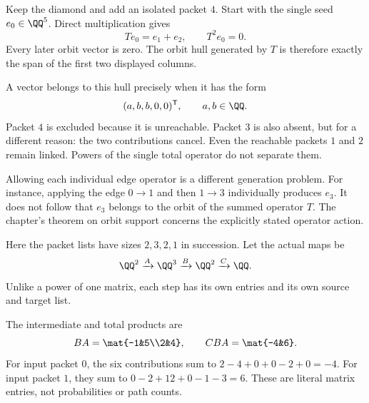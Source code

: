 Keep the diamond and add an isolated packet $4$. Start with the single seed $e_0\in\QQ^5$. Direct multiplication gives
\[
Te_0=e_1+e_2,\qquad T^2e_0=0.
\]
Every later orbit vector is zero. The orbit hull generated by $T$ is therefore exactly the span of the first two displayed columns.


A vector belongs to this hull precisely when it has the form
\[
(a,b,b,0,0)^\mathsf T,\qquad a,b\in\QQ.
\]
Packet $4$ is excluded because it is unreachable. Packet $3$ is also absent, but for a different reason: the two contributions cancel. Even the reachable packets $1$ and $2$ remain linked. Powers of the single total operator do not separate them.

Allowing each individual edge operator is a different generation problem. For instance, applying the edge $0\to1$ and then $1\to3$ individually produces $e_3$. It does not follow that $e_3$ belongs to the orbit of the summed operator $T$. The chapter's theorem on orbit support concerns the explicitly stated operator action.


Here the packet lists have sizes $2,3,2,1$ in succession. Let the actual maps be
\[
\QQ^2\xrightarrow{A}\QQ^3\xrightarrow{B}\QQ^2\xrightarrow{C}\QQ.
\]
Unlike a power of one matrix, each step has its own entries and its own source and target list.


The intermediate and total products are
\[
BA=\mat{-1&5\\2&4},\qquad CBA=\mat{-4&6}.
\]
For input packet $0$, the six contributions sum to $2-4+0+0-2+0=-4$. For input packet $1$, they sum to $0-2+12+0-1-3=6$. These are literal matrix entries, not probabilities or path counts.

